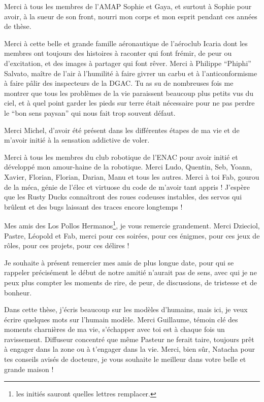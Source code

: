 \documentclass[english,a4paper,11pt,twoside]{StyleThese}
\begin{document}
Merci à tous les membres de l'AMAP Sophie et Gaya, et surtout à Sophie pour avoir, à la sueur de son front, nourri mon corps et mon esprit pendant ces années de thèse.

Merci à cette belle et grande famille aéronautique de l'aéroclub Icaria dont les membres ont toujours des histoires à raconter qui font frémir, de peur ou d'excitation, et des images à partager qui font rêver. Merci à Philippe ``Phiphi'' Salvato, maître de l'air à l'humilité à faire givrer un carbu et à l'anticonformisme à faire pâlir des inspecteurs de la DGAC. Tu as su de nombreuses fois me montrer que tous les problèmes de la vie paraissent beaucoup plus petits vus du ciel, et à quel point garder les pieds sur terre était nécessaire pour ne pas perdre le ``bon sens paysan'' qui nous fait trop souvent défaut.

Merci Michel, d'avoir été présent dans les différentes étapes de ma vie et de m'avoir initié à la sensation addictive de voler.

\smallskip

Merci à tous les membres du club robotique de l'ENAC pour avoir initié et développé mon amour-haine de la robotique. Merci Ludo, Quentin, Seb, Yoann, Xavier, Florian, Florian, Darian, Manu et tous les autres. Merci à toi Fab, gourou de la méca, génie de l'élec et virtuose du code de m'avoir tant appris ! J'espère que les Rusty Ducks connaîtront des roues codeuses instables, des servos qui brûlent et des bugs laissant des traces encore longtemps !

\medskip

Mes amis des Los Pollos Hermanos\footnote{les initiés sauront quelles lettres remplacer.}, je vous remercie grandement. Merci Dzieciol, Pastre, Léopold et Fab, merci pour ces soirées, pour ces énigmes, pour ces jeux de rôles, pour ces projets, pour ces délires !

\smallskip

Je souhaite à présent remercier mes amis de plus longue date, pour qui se rappeler précisément le début de notre amitié n'aurait pas de sens, avec qui je ne peux plus compter les moments de rire, de peur, de discussions, de tristesse et de bonheur. 

Dans cette thèse, j'écris beaucoup sur les modèles d'humains, mais ici, je veux écrire quelques mots sur l'humain modèle. Merci Guillaume, témoin clé des moments charnières de ma vie, s'échapper avec toi est à chaque fois un ravissement. Diffuseur concentré que même Pasteur ne ferait taire, toujours prêt à engager dans la zone ou à t'engager dans la vie. Merci, bien sûr, Natacha pour tes conseils avisés de docteure, je vous souhaite le meilleur dans votre belle et grande maison !
\end{document}
